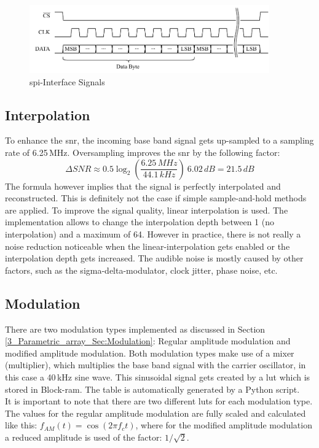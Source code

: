 \begin{figure}[h!]
    \centering
    \includegraphics[width=0.92\textwidth]{images/4_Design/FPGA/SPI-Interface.pdf}
    \caption{\acrshort{spi}-Interface Signals}
    \label{4_fig:fpga_spi_signals}
\end{figure}

\newpage
\subsection{Interpolation} \label{fpga_interpolation}
To enhance the \acrfull{snr}, the incoming base band signal gets up-sampled to a sampling rate of 6.25\,MHz. Oversampling improves the \acrshort{snr} by the following factor:
\begin{equation}
    \Delta SNR \approx 0.5 \log_2 \left(\frac{6.25\,MHz}{44.1\,kHz}\right)\  6.02\,dB = 21.5\,dB
\end{equation}
The formula however implies that the signal is perfectly interpolated and reconstructed. This is definitely not the case if simple sample-and-hold methods are applied. To improve the signal quality, linear interpolation is used. The implementation allows to change the interpolation depth between 1 (no interpolation) and a maximum of 64. However in practice, there is not really a noise reduction noticeable when the linear-interpolation gets enabled or the interpolation depth gets increased. The audible noise is mostly caused by other factors, such as the sigma-delta-modulator, clock jitter, phase noise, etc.

\subsection{Modulation}
There are two modulation types implemented as discussed in Section \ref{3_Parametric_array_Sec:Modulation}: Regular amplitude modulation and modified amplitude modulation. Both modulation types make use of a mixer (multiplier), which multiplies the base band signal with the carrier oscillator, in this case a 40\,kHz sine wave. This sinusoidal signal gets created by a \acrfull{lut} which is stored in Block-\acrshort{ram}. The table is automatically generated by a Python script.\\
It is important to note that there are two different \acrshort{lut}s for each modulation type. The values for the regular amplitude modulation are fully scaled and calculated like this: $f_{AM}(t) = \cos(2\pi f_c t)$, where for the modified amplitude modulation a reduced amplitude is used of the factor: $1/\sqrt{2}$.

